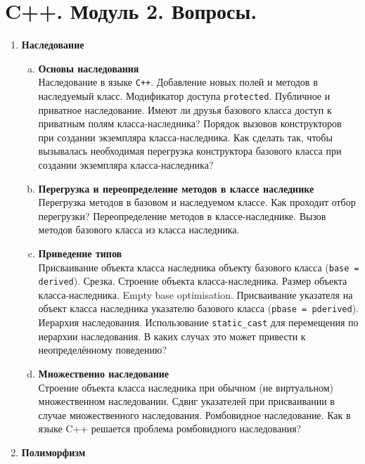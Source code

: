 \documentclass{article}
\begin{document}

\section*{C++. Модуль 2. Вопросы.}
\begin{enumerate}

\item \textbf{Наследование}
\begin{enumerate}[a.]
\item \textbf{Основы наследования}\\
Наследование в языке \texttt{C++}. Добавление новых полей и методов в наследуемый класс. Модификатор доступа \texttt{protected}. Публичное и приватное наследование. Имеют ли друзья базового класса доступ к приватным полям класса-наследника? 
Порядок вызовов конструкторов при создании экземпляра класса-наследника. Как сделать так, чтобы вызывалась необходимая перегрузка конструктора базового класса при создании экземпляра класса-наследника?

\item \textbf{Перегрузка и переопределение методов в классе наследнике}\\
Перегрузка методов в базовом и наследуемом классе. Как проходит отбор перегрузки? Переопределение  методов в классе-наследнике. Вызов методов базового класса из класса наследника.

\item \textbf{Приведение типов}\\
Присваивание объекта класса наследника объекту базового класса (\texttt{base = derived}). Срезка.
Строение объекта класса-наследника. Размер объекта класса-наследника. Empty base optimisation. Присваивание указателя на объект класса наследника указателю базового класса (\texttt{pbase = pderived}).
Иерархия наследования. Использование \texttt{static\_cast} для перемещения по иерархии наследования. В каких случах это может привести к неопределённому поведению?


\item \textbf{Множественно наследование}\\
Строение объекта класса наследника при обычном (не виртуальном) множественном наследовании.
Сдвиг указателей при присваивании в случае множественного наследования. Ромбовидное наследование. Как в языке C++ решается проблема ромбовидного наследования?
\end{enumerate}




\item \textbf{Полиморфизм}
\begin{enumerate}[a.]


\end{enumerate}
\end{enumerate}
\end{document}
